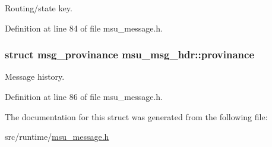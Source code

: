Routing/state key. 



Definition at line 84 of file msu\-\_\-message.\-h.

\hypertarget{structmsu__msg__hdr_ab64c7b4c508dd04d23bbd940cd6dabea}{
\subsubsection[{provinance}]{\setlength{\rightskip}{0pt plus 5cm}struct {\bf msg\-\_\-provinance} msu\-\_\-msg\-\_\-hdr\-::provinance}}\label{structmsu__msg__hdr_ab64c7b4c508dd04d23bbd940cd6dabea}


Message history. 



Definition at line 86 of file msu\-\_\-message.\-h.



The documentation for this struct was generated from the following file\-:\begin{DoxyCompactItemize}
\item 
src/runtime/\hyperlink{msu__message_8h}{msu\-\_\-message.\-h}\end{DoxyCompactItemize}
